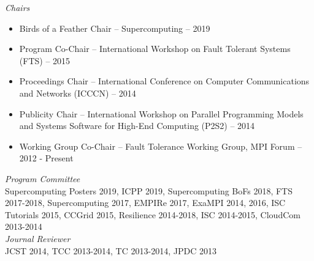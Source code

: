 {\sl Chairs}
\begin{itemize}
    \item Birds of a Feather Chair -- Supercomputing -- 2019
    \item Program Co-Chair -- International Workshop on Fault Tolerant Systems
        (FTS) -- 2015
    \item Proceedings Chair -- International Conference on Computer
        Communications and Networks (ICCCN) -- 2014
    \item Publicity Chair -- International Workshop on Parallel Programming
        Models and Systems Software for High-End Computing (P2S2) -- 2014
    \item Working Group Co-Chair -- Fault Tolerance Working Group, MPI Forum -- 2012 - Present
\end{itemize}

{\sl Program Committee} \\
Supercomputing Posters 2019, ICPP 2019, Supercomputing BoFs 2018, FTS 2017-2018, Supercomputing
2017, EMPIRe 2017, ExaMPI 2014, 2016, ISC Tutorials 2015, CCGrid 2015, Resilience 2014-2018, ISC
2014-2015, CloudCom 2013-2014 \\

{\sl Journal Reviewer} \\
JCST 2014, TCC 2013-2014, TC 2013-2014, JPDC 2013 \\

